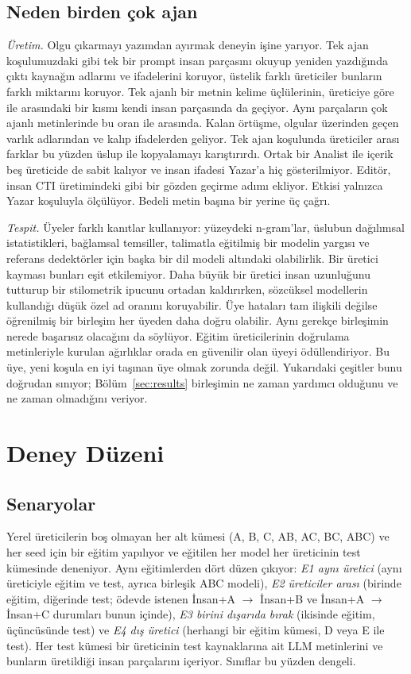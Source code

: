 \documentclass[journal]{IEEEtran}
\begin{document}
\subsection{Neden birden çok ajan}\label{sec:why}
\emph{Üretim.} Olgu çıkarmayı yazımdan ayırmak deneyin işine yarıyor. Tek ajan koşulumuzdaki gibi tek bir prompt
insan parçasını okuyup yeniden yazdığında çıktı kaynağın adlarını ve ifadelerini koruyor, üstelik farklı üreticiler
bunların farklı miktarını koruyor. Tek ajanlı bir metnin kelime üçlülerinin, üreticiye göre \OverlapSingleMin{} ile
\OverlapSingleMax{} arasındaki bir kısmı kendi insan parçasında da geçiyor. Aynı parçaların çok ajanlı metinlerinde
bu oran \OverlapMultiMin{} ile \OverlapMultiMax{} arasında. Kalan örtüşme, olgular üzerinden geçen varlık adlarından
ve kalıp ifadelerden geliyor. Tek ajan koşulunda üreticiler arası farklar bu yüzden üslup ile kopyalamayı
karıştırırdı. Ortak bir Analist ile içerik beş üreticide de sabit kalıyor ve insan ifadesi Yazar'a hiç
gösterilmiyor. Editör, insan CTI üretimindeki gibi bir gözden geçirme adımı ekliyor. Etkisi yalnızca Yazar koşuluyla
ölçülüyor. Bedeli metin başına bir yerine üç çağrı.

\emph{Tespit.} Üyeler farklı kanıtlar kullanıyor: yüzeydeki n-gram'lar, üslubun dağılımsal istatistikleri,
bağlamsal temsiller, talimatla eğitilmiş bir modelin yargısı ve referans dedektörler için başka bir dil modeli
altındaki olabilirlik. Bir üretici kayması bunları eşit etkilemiyor. Daha büyük bir üretici insan uzunluğunu
tutturup bir stilometrik ipucunu ortadan kaldırırken, sözcüksel modellerin kullandığı düşük özel ad oranını
koruyabilir. Üye hataları tam ilişkili değilse öğrenilmiş bir birleşim her üyeden daha doğru olabilir. Aynı
gerekçe birleşimin nerede başarısız olacağını da söylüyor. Eğitim üreticilerinin doğrulama metinleriyle kurulan
ağırlıklar orada en güvenilir olan üyeyi ödüllendiriyor. Bu üye, yeni koşula en iyi taşınan üye olmak zorunda
değil. Yukarıdaki çeşitler bunu doğrudan sınıyor; Bölüm~\ref{sec:results} birleşimin ne zaman yardımcı olduğunu ve
ne zaman olmadığını veriyor.

\section{Deney Düzeni}\label{sec:setup}
\subsection{Senaryolar}
Yerel üreticilerin boş olmayan her alt kümesi (A, B, C, AB, AC, BC, ABC) ve her seed için bir eğitim yapılıyor ve
eğitilen her model her üreticinin test kümesinde deneniyor. Aynı eğitimlerden dört düzen çıkıyor: \emph{E1 aynı
üretici} (aynı üreticiyle eğitim ve test, ayrıca birleşik ABC modeli), \emph{E2 üreticiler arası} (birinde eğitim,
diğerinde test; ödevde istenen İnsan+A $\rightarrow$ İnsan+B ve İnsan+A $\rightarrow$ İnsan+C durumları bunun
içinde), \emph{E3 birini dışarıda bırak} (ikisinde eğitim, üçüncüsünde test) ve \emph{E4 dış üretici} (herhangi bir
eğitim kümesi, D veya E ile test). Her test kümesi bir üreticinin test kaynaklarına ait LLM metinlerini ve bunların
üretildiği insan parçalarını içeriyor. Sınıflar bu yüzden dengeli.
\end{document}
